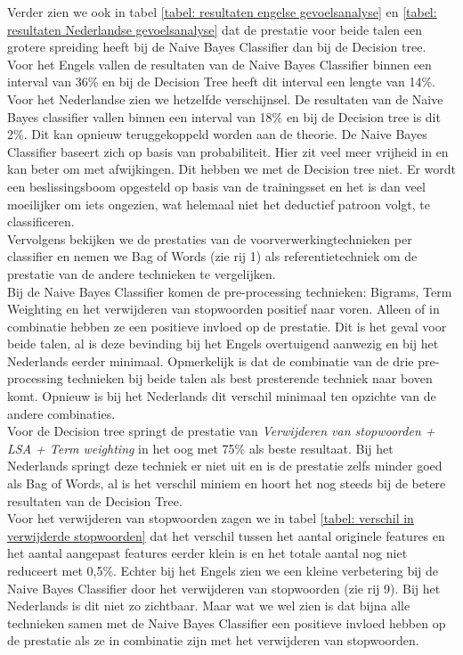 Verder zien we ook in tabel \ref{tabel: resultaten engelse gevoelsanalyse} en \ref{tabel: resultaten Nederlandse gevoelsanalyse} dat de prestatie voor beide talen een grotere spreiding heeft bij de Naive Bayes Classifier dan bij de Decision tree. Voor het Engels vallen de resultaten van de Naive Bayes Classifier binnen een interval van 36\% en bij de Decision Tree heeft dit interval een lengte van 14\%. Voor het Nederlandse zien we hetzelfde verschijnsel. De resultaten van de Naive Bayes classifier vallen binnen een interval van 18\% en bij de Decision tree is dit 2\%. Dit kan opnieuw teruggekoppeld worden aan de theorie. De Naive Bayes Classifier baseert zich op basis van probabiliteit. Hier zit veel meer vrijheid in en kan beter om met afwijkingen. Dit hebben we met de Decision tree niet. Er wordt een beslissingsboom opgesteld op basis van de trainingsset en het is dan veel moeilijker om iets ongezien, wat helemaal niet het deductief patroon volgt, te classificeren.\\

Vervolgens bekijken we de prestaties van de voorverwerkingtechnieken per classifier en nemen we Bag of Words (zie rij 1) als referentietechniek om de prestatie van de andere technieken te vergelijken.\\
Bij de Naive Bayes Classifier komen de pre-processing technieken: Bigrams, Term Weighting en het verwijderen van stopwoorden positief naar voren. Alleen of in combinatie hebben ze een positieve invloed op de prestatie. Dit is het geval voor beide talen, al is deze bevinding bij het Engels overtuigend aanwezig en bij het Nederlands eerder minimaal. Opmerkelijk is dat de combinatie van de drie pre-processing technieken bij beide talen als best presterende techniek naar boven komt. Opnieuw is bij het Nederlands dit verschil minimaal ten opzichte van de andere combinaties.\\
Voor de Decision tree springt de prestatie van \textit{Verwijderen van stopwoorden + LSA + Term weighting} in het oog met 75\% als beste resultaat. Bij het Nederlands springt deze techniek er niet uit en is de prestatie zelfs minder goed als Bag of Words, al is het verschil miniem en hoort het nog steeds bij de betere resultaten van de Decision Tree.\\

Voor het verwijderen van stopwoorden zagen we in tabel \ref{tabel: verschil in verwijderde stopwoorden} dat het verschil tussen het aantal originele features en het aantal aangepast features eerder klein is en het totale aantal nog niet reduceert met 0,5\%. Echter bij het Engels zien we een kleine verbetering bij de Naive Bayes Classifier door het verwijderen van stopwoorden (zie rij 9). Bij het Nederlands is dit niet zo zichtbaar. Maar wat we wel zien is dat bijna alle technieken samen met de Naive Bayes Classifier een positieve invloed hebben op de prestatie als ze in combinatie zijn met het verwijderen van stopwoorden.\\

